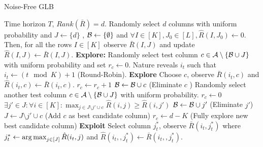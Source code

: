 \begin{algorithm}[!th]
\caption{Noise-Free GLB}
\label{alg:NFGLB}
\begin{algorithmic}
 Time horizon $T$, $Rank(\bar{R}) = d$.
 Randomly select $d$ columns with uniform probability and $J\leftarrow \lbrace d \rbrace$ , $\mathcal{B} \leftarrow \lbrace\emptyset\rbrace$ and $\forall I\in [K], J_0\in [L], \hat{R}(I,J_0) \leftarrow 0$.
\State Then, for all the rows $I\in[K]$ observe $\bar{R}(I,J)$ and update  $\hat{R}(I,J) \leftarrow \bar{R}(I,J)$.
\State \textbf{Explore: } Randomly select test column $c \in \mathcal{A} \setminus \lbrace\mathcal{B} \cup J\rbrace$ with uniform probability and set $r_c \leftarrow 0$.
\State Nature reveals $i_t$ such that $i_t \leftarrow (t \mod K) + 1$ (Round-Robin).
 \textbf{Explore}
\State Choose $c$, observe $\bar{R}(i_t,c)$ and $\hat{R}(i_t,c)\leftarrow \bar{R}(i_t,c)$.
\State $r_c \leftarrow r_c + 1$
\Else
\ColElim
\State {} 
\State  $\mathcal{B} \leftarrow \mathcal{B} \cup c$ (Eliminate $c$ )
\State Randomly select another test column $c \in \mathcal{A} \setminus \lbrace\mathcal{B} \cup J\rbrace$ with uniform probability.
\State $r_c \leftarrow 0$
\Else
\State $\exists j'\in J: \forall i\in [K]: \max_{j\in J \setminus{ j'} \cup c} \hat{R}(i,j) \geq \hat{R}(i,j')$
\State $\mathcal{B} \leftarrow \mathcal{B} \cup j' $ (Eliminate $j'$)
\State $J\leftarrow J \setminus{ j'} \cup c$ (Add $c$ as best candidate column)
\State $r_c \leftarrow d - K $ (Fully explore new best candidate column)
\EndIf
\EndColElim
\EndIf
{} \textbf{Exploit}
\State  Select column $j_t^*$, observe $\bar{R}(i_t,j_t^*)$ where $j_t^* \leftarrow \mathop{\rm arg\,max}_{j\in[J]} {\hat{R}(i_t,j)}$ and $\hat{R}(i_t,,j_t^*)\leftarrow \bar{R}(i_t,,j_t^*)$.
\EndIf
\EndFor
\end{algorithmic}
\end{algorithm}


